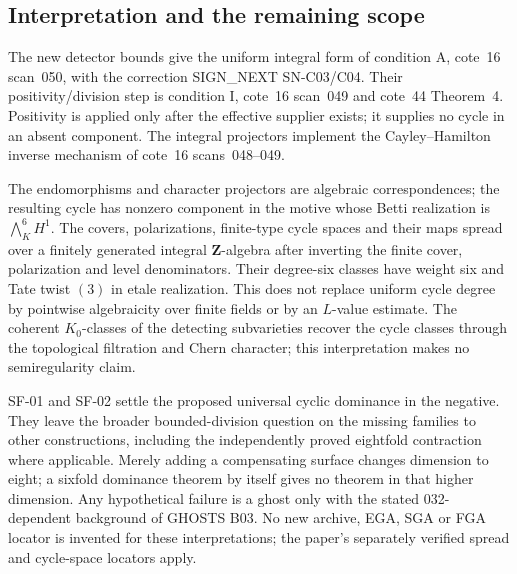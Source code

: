 \subsection{Interpretation and the remaining scope}
The new detector bounds give the uniform integral form of condition A,
cote~16 scan~050, with the correction SIGN\_NEXT SN-C03/C04. Their
positivity/division step is condition I, cote~16 scan~049 and cote~44
Theorem~4. Positivity is applied only after the effective supplier
exists; it supplies no cycle in an absent component. The integral
projectors implement the Cayley--Hamilton inverse mechanism of
cote~16 scans~048--049.

The endomorphisms and character projectors are algebraic
correspondences; the resulting cycle has nonzero component in the
motive whose Betti realization is $\bigwedge_K^6H^1$. The covers,
polarizations, finite-type cycle spaces and their maps spread over a
finitely generated integral $\mathbf Z$-algebra after inverting the
finite cover, polarization and level denominators. Their degree-six
classes have weight six and Tate twist $(3)$ in etale realization.
This does not replace uniform cycle degree by pointwise algebraicity
over finite fields or by an $L$-value estimate. The coherent
$K_0$-classes of the detecting subvarieties recover the cycle classes
through the topological filtration and Chern character; this
interpretation makes no semiregularity claim.

SF-01 and SF-02 settle the proposed universal cyclic dominance in the
negative. They leave the broader bounded-division question on the
missing families to other constructions, including the independently
proved eightfold contraction where applicable. Merely adding a
compensating surface changes dimension to eight; a sixfold dominance
theorem by itself gives no theorem in that higher dimension. Any
hypothetical failure is a ghost only with the stated 032-dependent
background of GHOSTS B03. No new archive, EGA, SGA or FGA locator is
invented for these interpretations; the paper's separately verified
spread and cycle-space locators apply.
